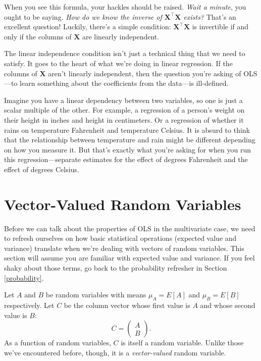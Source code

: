 \documentclass[
  12pt,
  oneside,openany]{book}
\begin{document}
When you see this formula, your hackles should be raised. \emph{Wait a minute}, you ought to be saying. \emph{How do we know the inverse of \(\mathbf{X}^\top \mathbf{X}\) exists?} That's an excellent question! Luckily, there's a simple condition: \(\mathbf{X}^\top \mathbf{X}\) is invertible if and only if the columns of \(\mathbf{X}\) are linearly independent.

The linear independence condition isn't just a technical thing that we need to satisfy. It goes to the heart of what we're doing in linear regression. If the columns of \(\mathbf{X}\) aren't linearly independent, then the question you're asking of OLS---to learn something about the coefficients from the data---is ill-defined.

Imagine you have a linear dependency between two variables, so one is just a scalar multiple of the other. For example, a regression of a person's weight on their height in inches and height in centimeters. Or a regression of whether it rains on temperature Fahrenheit and temperature Celsius. It is absurd to think that the relationship between temperature and rain might be different depending on how you measure it. But that's exactly what you're asking for when you run this regression---separate estimates for the effect of degrees Fahrenheit and the effect of degrees Celsius.

\hypertarget{vector-valued-random-variables}{%
\section{Vector-Valued Random Variables}\label{vector-valued-random-variables}}

Before we can talk about the properties of OLS in the multivariate case, we need to refresh ourselves on how basic statistical operations (expected value and variance) translate when we're dealing with vectors of random variables.
This section will assume you are familiar with expected value and variance.
If you feel shaky about those terms, go back to the probability refresher in Section \ref{probability}.

Let \(A\) and \(B\) be random variables with means \(\mu_A = E[A]\) and \(\mu_B = E[B]\) respectively. Let \(C\) be the column vector whose first value is \(A\) and whose second value is \(B\):
\[
C = \begin{pmatrix} A \\ B \end{pmatrix}.
\]
As a function of random variables, \(C\) is itself a random variable. Unlike those we've encountered before, though, it is a \emph{vector-valued} random variable.
\end{document}
